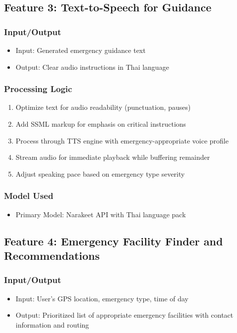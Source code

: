 \subsection{Feature 3: Text-to-Speech for Guidance}

\subsubsection{Input/Output}
\begin{itemize}
    \item Input: Generated emergency guidance text
    \item Output: Clear audio instructions in Thai language
\end{itemize}

\subsubsection{Processing Logic}
\begin{enumerate}
    \item Optimize text for audio readability (punctuation, pauses)
    \item Add SSML markup for emphasis on critical instructions
    \item Process through TTS engine with emergency-appropriate voice profile
    \item Stream audio for immediate playback while buffering remainder
    \item Adjust speaking pace based on emergency type severity
\end{enumerate}

\subsubsection{Model Used}
\begin{itemize}
    \item Primary Model: Narakeet API with Thai language pack
\end{itemize}

\subsection{Feature 4: Emergency Facility Finder and Recommendations}

\subsubsection{Input/Output}
\begin{itemize}
    \item Input: User's GPS location, emergency type, time of day
    \item Output: Prioritized list of appropriate emergency facilities with contact information and routing
\end{itemize}

